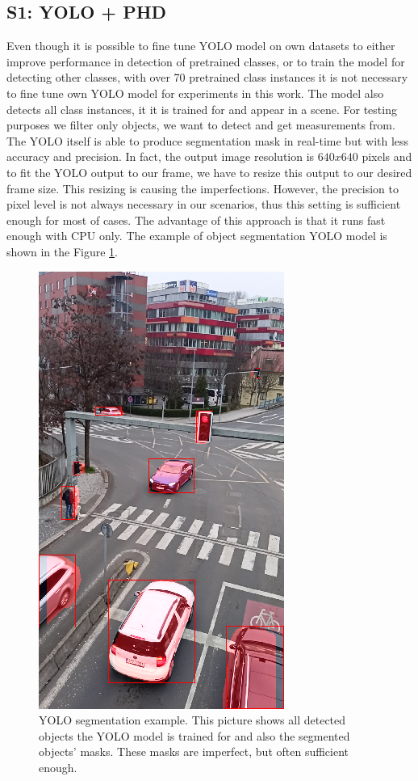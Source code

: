\subsection{S1: YOLO + PHD}
Even though it is possible to fine tune YOLO model on own datasets to either improve performance in detection of
pretrained classes, or to train the model for detecting other classes, with over 70 pretrained class instances it is
not necessary to fine tune own YOLO model for experiments in this work. The model also detects all class instances, it
it is trained for and appear in a scene. For testing purposes we filter only objects, we want to detect and get
measurements from. The YOLO itself is able to produce segmentation mask in real-time but with less accuracy and
precision. In fact, the output image resolution is $640x640$ pixels and to fit the YOLO output to our frame, we have
to resize this output to our desired frame size. This resizing is causing the imperfections. However, the precision
to pixel level is not always necessary in our scenarios, thus this setting
is sufficient
enough for most of cases. The advantage of this approach is that it runs fast enough with CPU only. The example of
object segmentation YOLO model is shown in the Figure \ref{fig:yolo_seg}.
\begin{figure}[h]
  \centering
  \includegraphics[width=0.35\linewidth]{text/chapter_04/imgs/YOLO_screenshot_2}
  \caption{YOLO segmentation example. This picture shows all detected objects the YOLO model is trained for and also
  the segmented objects' masks. These masks are imperfect, but often sufficient enough.}
  \label{fig:yolo_seg}
\end{figure}

